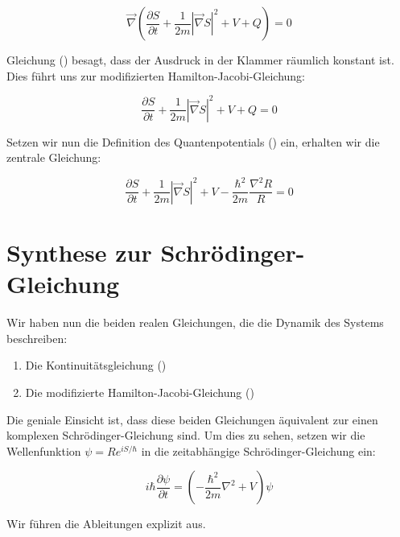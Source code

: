 \begin{equation}
    \label{eq:zwischenstand}
    \vec{\nabla} \left( \frac{\partial S}{\partial t} + \frac{1}{2m} \left| \vec{\nabla} S \right|^2 + V + Q \right) = 0
\end{equation}

Gleichung () besagt, dass der Ausdruck in der Klammer räumlich konstant ist. Dies führt uns zur modifizierten Hamilton-Jacobi-Gleichung:

\begin{equation}
    \frac{\partial S}{\partial t} + \frac{1}{2m} \left| \vec{\nabla} S \right|^2 + V + Q = 0
\end{equation}

Setzen wir nun die Definition des Quantenpotentials () ein, erhalten wir die zentrale Gleichung:

\begin{equation}
    \label{eq:modifizierte_hamilton_jacobi}
    \frac{\partial S}{\partial t} + \frac{1}{2m} \left| \vec{\nabla} S \right|^2 + V - \frac{\hbar^2}{2m} \frac{\nabla^2 R}{R} = 0
\end{equation}

\section{Synthese zur Schrödinger-Gleichung}
\label{sec:schrödinger_gleichung}
Wir haben nun die beiden realen Gleichungen, die die Dynamik des Systems beschreiben:

\begin{enumerate}
    \item Die Kontinuitätsgleichung ()
    \item Die modifizierte Hamilton-Jacobi-Gleichung ()
\end{enumerate}

Die geniale Einsicht ist, dass diese beiden Gleichungen äquivalent zur einen komplexen Schrödinger-Gleichung sind. Um dies zu sehen, setzen wir die Wellenfunktion $\psi = R e^{iS/\hbar}$
in die zeitabhängige Schrödinger-Gleichung ein:

\begin{equation}
    i\hbar \frac{\partial \psi}{\partial t} = \left( -\frac{\hbar^2}{2m} \nabla^2 + V \right) \psi
\end{equation}

Wir führen die Ableitungen explizit aus.


